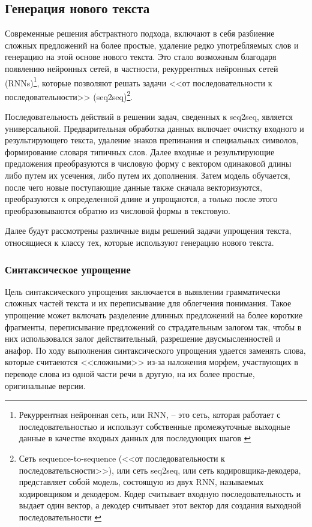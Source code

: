 \subsection{Генерация нового текста}
Современные решения абстрактного подхода,  включают в себя разбиение сложных предложений на более простые, удаление редко употребляемых слов и генерацию на этой основе нового текста. Это стало возможным благодаря появлению нейронных сетей, в частности, рекуррентных нейронных сетей (RNNs)\footnote{Рекуррентная нейронная сеть, или RNN, -- это сеть, которая работает с последовательностью и использут собственные промежуточные выходные данные в качестве входных данных для последующих шагов \cite{noauthor_nlp_nodate}}, которые позволяют решать задачи <<от последовательности к последовательности>> (seq2seq)\footnote{Сеть sequence-to-sequence (<<от последовательности к последовательсности>>), или сеть seq2seq, или сеть кодировщика-декодера, представляет собой модель, состоящую из двух RNN, называемых кодировщиком и декодером. Кодер считывает входную последовательность и выдает один вектор, а декодер считывает этот вектор для создания выходной последовательности \cite{noauthor_nlp_nodate}}.

Последовательность действий в решении задач, сведенных к seq2seq, является универсальной. Предварительная обработка данных включает очистку входного и результирующего текста, удаление знаков препинания и специальных символов, формирование словаря типичных слов. Далее входные и результирующие предложения преобразуются в числовую форму с вектором одинаковой длины либо путем их усечения, либо путем их дополнения. Затем модель обучается, после чего новые поступающие данные также сначала векторизуются, преобразуются к определенной длине и упрощаются, а только после этого преобразовываются обратно из числовой формы в текстовую.

Далее будут рассмотрены различные виды решений задачи упрощения текста, относящиеся к классу тех, которые используют генерацию нового текста.

\subsubsection{Синтаксическое упрощение}

Цель синтаксического упрощения заключается в выявлении грамматически сложных частей текста и их переписывание для облегчения понимания. Такое упрощение может включать разделение длинных предложений на более короткие фрагменты, переписывание предложений со страдательным залогом так, чтобы в них использовался залог действительный\footnotemark{}, разрешение двусмысленностей и анафор\cite{shardlow_survey_2014}. По ходу выполнения синтаксического упрощения удается заменять слова, которые считаеются <<сложными>> из-за наложения морфем, участвующих в переводе слова из одной части речи в другую, на их более простые, оригинальные версии.

